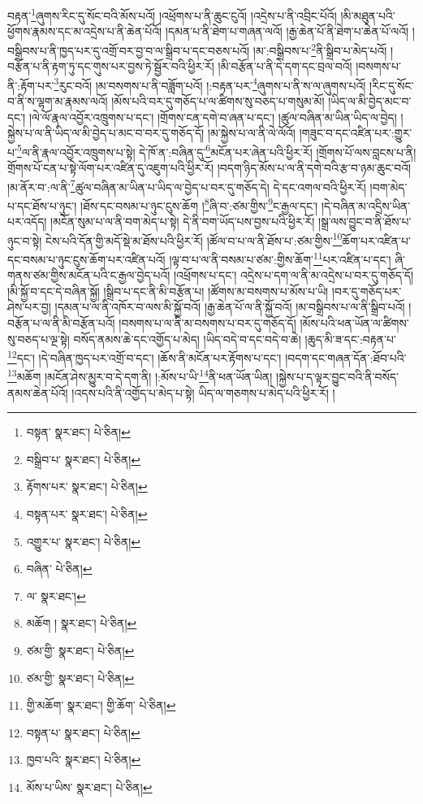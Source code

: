 བརྟན་\footnote{བསྟན་  སྣར་ཐང་།  པེ་ཅིན། }ཞུགས་རིང་དུ་སོང་བའི་མོས་པའོ། །འཕྲོགས་པ་ནི་ཆུང་ངུའོ། །འདྲེས་པ་ནི་འབྲིང་པོའོ། །མི་མཐུན་པའི་ཕྱོགས་རྣམས་དང་མ་འདྲེས་པ་ནི་ཆེན་པོའོ། །དམན་པ་ནི་ཐེག་པ་གཞན་ལའོ། །རྒྱ་ཆེན་པོ་ནི་ཐེག་པ་ཆེན་པོ་ལའོ། །བསྒྲིབས་པ་ནི་ཁྱད་པར་དུ་འགྲོ་བར་བྱ་བ་ལ་སྒྲིབ་པ་དང་བཅས་པའོ། །མ་:བསྒྲིབས་པ་\footnote{བསྒྲིབ་པ་  སྣར་ཐང་།  པེ་ཅིན། }ནི་སྒྲིབ་པ་མེད་པའོ། །བརྩོན་པ་ནི་རྟག་ཏུ་དང་གུས་པར་བྱས་ཏེ་སྦྱོར་བའི་ཕྱིར་རོ། །མི་བརྩོན་པ་ནི་དེ་དག་དང་བྲལ་བའོ། །བསགས་པ་ནི་:རྟོག་པར་\footnote{རྟོགས་པར་  སྣར་ཐང་།  པེ་ཅིན། }རུང་བའོ། །མ་བསགས་པ་ནི་བཟློག་པའོ། །:བརྟན་པར་\footnote{བསྟན་པར་  སྣར་ཐང་།  པེ་ཅིན། }ཞུགས་པ་ནི་ས་ལ་ཞུགས་པའོ། །རིང་དུ་སོང་བ་ནི་ས་ལྷག་མ་རྣམས་ལའོ། །མོས་པའི་བར་དུ་གཅོད་པ་ལ་ཚིགས་སུ་བཅད་པ་གསུམ་མོ། །ཡིད་ལ་མི་བྱེད་མང་བ་དང་། །ལེ་ལོ་རྣལ་འབྱོར་འཁྲུགས་པ་དང་། །གྲོགས་ངན་དགེ་བ་ཞན་པ་དང་། །ཚུལ་བཞིན་མ་ཡིན་ཡིད་ལ་བྱེད། །སྐྱེས་པ་ལ་ནི་ཡིད་ལ་མི་བྱེད་པ་མང་བ་བར་དུ་གཅོད་དོ། །མ་སྐྱེས་པ་ལ་ནི་ལེ་ལོའོ། །གཟུང་བ་དང་འཛིན་པར་:གྱུར་པ་\footnote{འགྱུར་པ་  སྣར་ཐང་།  པེ་ཅིན། }ལ་ནི་རྣལ་འབྱོར་འཁྲུགས་པ་སྟེ། དེ་ཁོ་ན་:བཞིན་དུ་\footnote{བཞིན་  པེ་ཅིན། }མངོན་པར་ཞེན་པའི་ཕྱིར་རོ། །གྲོགས་པོ་ལས་བླངས་པ་ནི། གྲོགས་པོ་ངན་པ་སྟེ་ལོག་པར་འཛིན་དུ་འཇུག་པའི་ཕྱིར་རོ། །བདག་ཉིད་མོས་པ་ལ་ནི་དགེ་བའི་རྩ་བ་ཉམ་ཆུང་བའོ། །མ་ནོར་བ་:ལ་ནི་\footnote{ལ་  སྣར་ཐང་། }ཚུལ་བཞིན་མ་ཡིན་པ་ཡིད་ལ་བྱེད་པ་བར་དུ་གཅོད་དེ། དེ་དང་འགལ་བའི་ཕྱིར་རོ། །བག་མེད་པ་དང་ཐོས་པ་ཉུང་། །ཐོས་དང་བསམ་པ་ཉུང་ངུས་ཆོག །\footnote{མཆོག །  སྣར་ཐང་།  པེ་ཅིན། }ཞི་བ་:ཙམ་གྱིས་\footnote{ཙམ་གྱི་  སྣར་ཐང་།  པེ་ཅིན། }ང་རྒྱལ་དང་། །དེ་བཞིན་མ་འདྲིས་ཡིན་པར་འདོད། །མངོན་སུམ་པ་ལ་ནི་བག་མེད་པ་སྟེ། དེ་ནི་བག་ཡོད་པས་བྱས་པའི་ཕྱིར་རོ། །སྒྲ་ལས་བྱུང་བ་ནི་ཐོས་པ་ཉུང་བ་སྟེ། ངེས་པའི་དོན་གྱི་མདོ་སྡེ་མ་ཐོས་པའི་ཕྱིར་རོ། །ཚོལ་བ་པ་ལ་ནི་ཐོས་པ་:ཙམ་གྱིས་\footnote{ཙམ་གྱི་  སྣར་ཐང་།  པེ་ཅིན། }ཆོག་པར་འཛིན་པ་དང་བསམ་པ་ཉུང་ངུས་ཆོག་པར་འཛིན་པའོ། །ལྟ་བ་པ་ལ་ནི་བསམ་པ་ཙམ་:གྱིས་ཆོག་\footnote{གྱི་མཆོག་  སྣར་ཐང་། གྱི་ཆོག་  པེ་ཅིན། }པར་འཛིན་པ་དང་། ཞི་གནས་ཙམ་གྱིས་མངོན་པའི་ང་རྒྱལ་བྱེད་པའོ། །འཕྲོགས་པ་དང་། འདྲེས་པ་དག་ལ་ནི་མ་འདྲེས་པ་བར་དུ་གཅོད་དོ། །མི་སྐྱོ་བ་དང་དེ་བཞིན་སྐྱོ། །སྒྲིབ་པ་དང་ནི་མི་བརྩོན་པ། །ཚོགས་མ་བསགས་པ་མོས་པ་ཡི། །བར་དུ་གཅོད་པར་ཤེས་པར་བྱ། །དམན་པ་ལ་ནི་འཁོར་བ་ལས་མི་སྐྱོ་བའོ། །རྒྱ་ཆེན་པོ་ལ་ནི་སྐྱོ་བའོ། །མ་བསྒྲིབས་པ་ལ་ནི་སྒྲིབ་པའོ། །བརྩོན་པ་ལ་ནི་མི་བརྩོན་པའོ། །བསགས་པ་ལ་ནི་མ་བསགས་པ་བར་དུ་གཅོད་དོ། །མོས་པའི་ཕན་ཡོན་ལ་ཚིགས་སུ་བཅད་པ་ལྔ་སྟེ། བསོད་ནམས་ཆེ་དང་འགྱོད་པ་མེད། །ཡིད་བདེ་བ་དང་བདེ་བ་ཆེ། །ཆུད་མི་ཟ་དང་:བརྟན་པ་\footnote{བསྟན་པ་  སྣར་ཐང་།  པེ་ཅིན། }དང་། །དེ་བཞིན་ཁྱད་པར་འགྲོ་བ་དང་། །ཆོས་ནི་མངོན་པར་རྟོགས་པ་དང་། །བདག་དང་གཞན་དོན་:ཐོབ་པའི་\footnote{ཁྱབ་པའི་  སྣར་ཐང་།  པེ་ཅིན། }མཆོག །མངོན་ཤེས་མྱུར་བ་དེ་དག་ནི། །:མོས་པ་ཡི་\footnote{མོས་པ་ཡིས་  སྣར་ཐང་།  པེ་ཅིན། }ནི་ཕན་ཡོན་ཡིན། །སྐྱེས་པ་ད་ལྟར་བྱུང་བའི་ནི་བསོད་ནམས་ཆེན་པོའོ། །འདས་པའི་ནི་འགྱོད་པ་མེད་པ་སྟེ། ཡིད་ལ་གཅགས་པ་མེད་པའི་ཕྱིར་རོ། །
